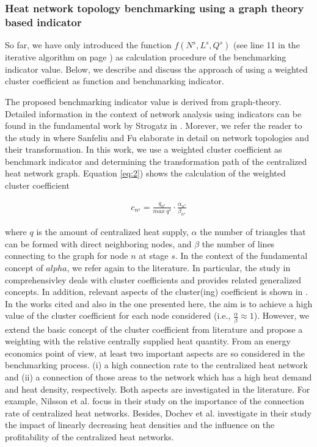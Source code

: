 \subsubsection{Heat network topology benchmarking using a graph theory based indicator}\label{bench}
So far, we have only introduced the function $f(N^{s}, L^{s}, Q^{s})$ (see line 11 in the iterative algorithm on page \pageref{Alg:2}) as calculation procedure of the benchmarking indicator value. Below, we describe and discuss the approach of using a weighted cluster coefficient as function and benchmarking indicator.\vspace{0.3cm}

The proposed benchmarking indicator value is derived from graph-theory. Detailed information in the context of network analysis using indicators can be found in the fundamental work by Strogatz in \cite{strogatz2001exploring}. Morever, we refer the reader to the study in \cite{sanfeliu1983distance} where Sanfeliu and Fu elaborate in detail on network topologies and their transformation. In this work, we use a weighted cluster coefficient as benchmark indicator and determining the transformation path of the centralized heat network graph. Equation \ref{eq:2}) shows the calculation of the weighted cluster coefficient

\begin{align}\label{eq:2}
c_{n^{s}}=\frac{q_{n^{s}}}{max~q^{s}}\cdot \frac{\alpha_{n^{s}}}{\beta_{n^{s}}}
\end{align}

where $q$ is the amount of centralized heat supply, $\alpha$ the number of triangles that can be formed with direct neighboring nodes, and $\beta$ the number of lines connecting to the graph for node $n$ at stage $s$. In the context of the fundamental concept of $alpha$, we refer again to the literature. In particular, the study in \cite{huang2010link} comprehensivley deals with cluster coefficients and provides related generalized concepts. In addition, relevant aspects of the cluster(ing) coefficient is shown in \cite{cui2014detecting}. In the works cited and also in the one presented here, the aim is to achieve a high value of the cluster coefficient for each node considered (i.e., $\frac{\alpha}{\beta} \approx 1$). However, we extend the basic concept of the cluster coefficient from literature and propose a weighting with the relative centrally supplied heat quantity. From an energy economics point of view, at least two important aspects are so considered in the benchmarking process. (i) a high connection rate to the centralized heat network and (ii) a connection of those areas to the network which has a high heat demand and heat density, respectively. Both aspects are investigated in the literature. For example, Nilsson et al. \cite{nilsson2008sparse} focus in their study on the importance of the connection rate of centralized heat networks. Besides, Dochev et al. \cite{dochev2018analysing} investigate in their study the impact of linearly decreasing heat densities and the influence on the profitability of the centralized heat networks.

